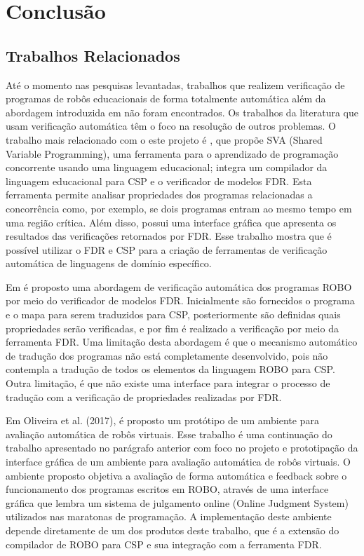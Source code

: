 \chapter{Conclusão}


\section{Trabalhos Relacionados}

Até o momento nas pesquisas levantadas, trabalhos que realizem verificação de programas de robôs educacionais de forma totalmente automática além da abordagem introduzida em \cite{nogueira} não foram encontrados. Os trabalhos da literatura que usam verificação automática têm o foco na resolução de outros problemas. O trabalho mais relacionado com o este projeto é \cite{SVA}, que propõe SVA (Shared Variable Programming), uma ferramenta para o aprendizado de programação concorrente usando uma linguagem educacional; integra um compilador da linguagem educacional para CSP e o verificador de modelos FDR. Esta ferramenta permite analisar propriedades dos programas relacionadas a concorrência como, por exemplo, se dois programas entram ao mesmo tempo em uma região crítica. Além disso, possui uma interface gráfica que apresenta os resultados das verificações retornados por FDR. Esse trabalho mostra que é possível utilizar o FDR e CSP para a criação de ferramentas de verificação automática de linguagens de domínio específico. 

Em \cite{nogueira} é proposto uma abordagem de verificação automática dos programas ROBO por meio do verificador de modelos FDR. Inicialmente são fornecidos o programa e o mapa para serem traduzidos para CSP, posteriormente são definidas quais propriedades serão verificadas, e por fim é realizado a verificação por meio da ferramenta FDR. Uma limitação desta abordagem é que o mecanismo automático de tradução dos programas não está completamente desenvolvido, pois não contempla a tradução de todos os elementos da linguagem ROBO para CSP. Outra limitação, é que não existe uma interface para integrar o processo de tradução com a verificação de propriedades realizadas por FDR.

Em Oliveira et al. (2017), é proposto um protótipo de um ambiente para avaliação automática de robôs virtuais. Esse trabalho é uma continuação do trabalho apresentado no parágrafo anterior com foco no projeto e prototipação da interface gráfica de um ambiente para avaliação automática de robôs virtuais. O ambiente proposto objetiva a avaliação de forma automática e feedback sobre o funcionamento dos programas escritos em ROBO, através de uma interface gráfica que lembra um sistema de julgamento online (Online Judgment System) utilizados nas maratonas de programação. A implementação deste ambiente depende diretamente de um dos produtos deste trabalho, que é a extensão do compilador de ROBO para CSP e sua integração com a ferramenta FDR.

